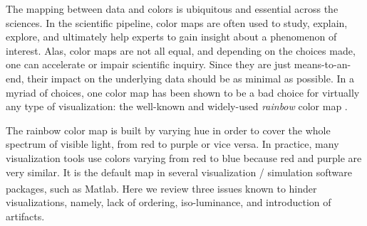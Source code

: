 The mapping between data and colors is ubiquitous and essential across the sciences. 
%
In the scientific pipeline, color maps are often used to study, explain, explore, and ultimately help 
experts to gain insight about a phenomenon of interest. 
% 
Alas, color maps are not all equal, and depending on the choices made, one can accelerate or 
impair scientific inquiry. 
%
Since they are just means-to-an-end, their impact on the underlying data should be as minimal as possible.
%
In a myriad of choices, one color map has been shown to be a bad choice for virtually any type of 
visualization: the well-known and widely-used \emph{rainbow} color map \cite{Borland:2007:RCM:1251554.1251614, 
macdonald1999using, Silva2011320}. 

The rainbow color map is built by varying hue in order to cover the whole spectrum of visible light, 
from red to purple or vice versa. In practice, many visualization tools use colors varying from red to blue because red and purple are very similar.
%
It is the default map in several visualization / simulation software packages, such as Matlab\textsuperscript{\textregistered}.  
%
Here we review three issues known to hinder visualizations, namely, lack of ordering, iso-luminance, 
and introduction of artifacts. 
%

